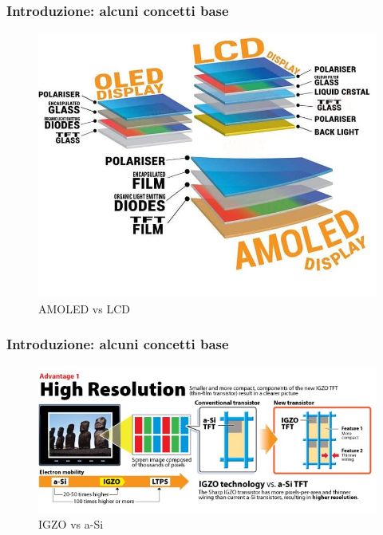 \documentclass[12pt]{beamer}
\begin{document}
	\begin{frame}
		\frametitle{Introduzione: alcuni concetti base}
		\begin{figure}
			\centering
			\includegraphics[width=0.8\linewidth]{IMMAGINI/AMOLED_VS_LCD}
			\caption{AMOLED vs LCD}
			\label{fig:amoledvslcd}
		\end{figure}	
	\end{frame}
	\begin{frame}
		\frametitle{Introduzione: alcuni concetti base}
		\begin{figure}
			\centering
			\includegraphics[width=1\linewidth]{IMMAGINI/IGZO-vs-aSi-1}
			\caption{IGZO vs a-Si}
			\label{fig:igzo-vs-asi-1}
		\end{figure}
	\end{frame}
\end{document}
